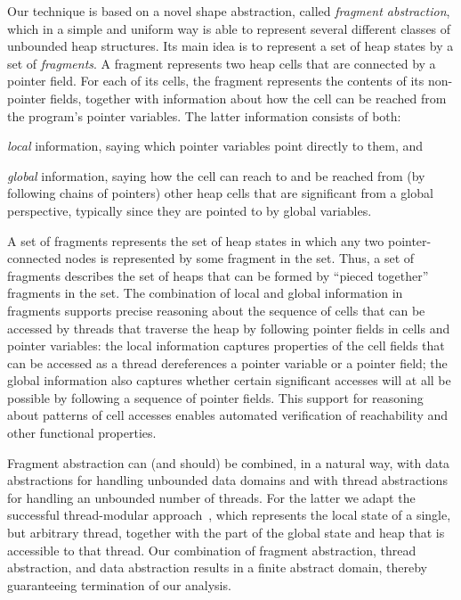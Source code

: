 Our technique is based on a novel shape abstraction,
called {\em fragment abstraction}, which in a simple and uniform way is able to
represent several different classes of unbounded heap structures.
Its main idea is to represent a set of heap states by a set of {\em fragments}.
A fragment represents two heap cells that are connected by a pointer field.
For each of its cells, 
the fragment represents the contents of its non-pointer fields, together with
information about how the cell can be reached from the program's pointer
variables. The latter information consists of both:
\begin{inparaenum}[(i)]
  \item {\em local} information, saying which pointer variables
    point directly to them, and
    \item {\em global} information, saying how the cell
      can reach to and be reached from (by following chains of pointers) other
      heap cells that are significant from a global perspective, typically
      since they are pointed to by global variables.
\end{inparaenum}
A set of fragments represents the set of heap states
in which any two pointer-connected nodes is represented by some
fragment in the set.
Thus, a set of fragments describes the set of heaps that can be formed by
``pieced together'' fragments in the set.
The combination of local and global information in fragments supports
precise reasoning about the sequence of cells that can be accessed by
threads that traverse the heap by following pointer fields in cells and
pointer variables:
the local information captures properties of the cell fields that can
be accessed as a thread dereferences a pointer variable or a pointer field;
the global information also captures whether certain significant accesses
will at all be possible by following a sequence of pointer fields.
This support for reasoning about patterns of cell accesses enables
automated verification of reachability and other functional properties.

Fragment abstraction can (and should) be combined, in a natural way,
with data abstractions for
handling unbounded data domains and with thread abstractions
for handling an unbounded number of threads.
For the latter we adapt
the successful thread-modular approach~\cite{BLMRS:cav08}, which
represents the local state of a single, but arbitrary thread, together
with the part of the global state and heap that is accessible to that thread.
Our combination of fragment abstraction, thread abstraction, and data
abstraction results in a finite abstract domain, thereby guaranteeing
termination of our analysis.

